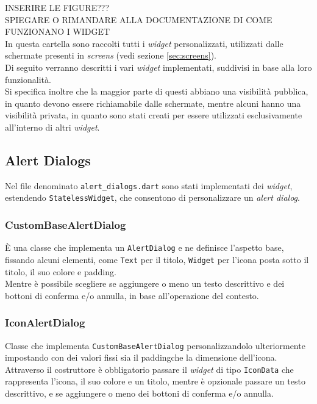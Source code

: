 INSERIRE LE FIGURE???\\
SPIEGARE O RIMANDARE ALLA DOCUMENTAZIONE DI COME FUNZIONANO I WIDGET\\

In questa cartella sono raccolti tutti i \emph{widget} personalizzati, utilizzati dalle schermate presenti in \emph{screens} (vedi sezione \ref{sec:screens}).\\
Di seguito verranno descritti i vari \emph{widget} implementati, suddivisi in base alla loro funzionalità.\\
Si specifica inoltre che la maggior parte di questi abbiano una visibilità pubblica, in quanto devono essere richiamabile dalle schermate, mentre alcuni hanno una visibilità privata, in quanto sono stati creati per essere utilizzati esclusivamente all'interno di altri \emph{widget}.\\

\subsection{Alert Dialogs}
\label{subsec:alert-dialogs}

Nel file denominato \lstinline{alert_dialogs.dart} sono stati implementati dei \emph{widget}, estendendo \lstinline{StatelessWidget}, che consentono di personalizzare un \emph{alert dialog}.\\

\subsubsection*{CustomBaseAlertDialog}
\label{subsubsec:custom-base-alert-dialog}

È una classe che implementa un \lstinline{AlertDialog}\cite{site:alert-dialog} e ne definisce l'aspetto base, fissando alcuni elementi, come \lstinline{Text}\cite{site:text} per il titolo, \lstinline{Widget} per l'icona posta sotto il titolo, il suo colore e \gls{padding}\glsoccur.\\
Mentre è possibile scegliere se aggiungere o meno un testo descrittivo e dei bottoni di conferma e/o annulla, in base all'operazione del contesto.\\

\subsubsection*{IconAlertDialog}
\label{subsubsec:icon-alert-dialog}

Classe che implementa \lstinline{CustomBaseAlertDialog} personalizzandolo ulteriormente impostando con dei valori fissi sia il \gls{padding}\glsoccur che la dimensione dell'icona.\\
Attraverso il costruttore è obbligatorio passare il \emph{widget} di tipo \lstinline{IconData}\cite{site:icon-data} che rappresenta l'icona, il suo colore e un titolo, mentre è opzionale passare un testo descrittivo, e se aggiungere o meno dei bottoni di conferma e/o annulla.\\

